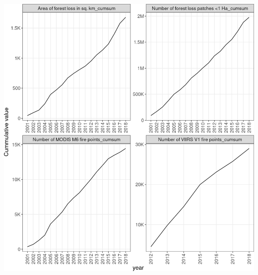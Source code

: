 \documentclass[10pt,landscape,a3paper]{article}
\begin{document}
\begin{center}\includegraphics{img/modelling/aa-eda-ts-2} \end{center}
\end{document}
